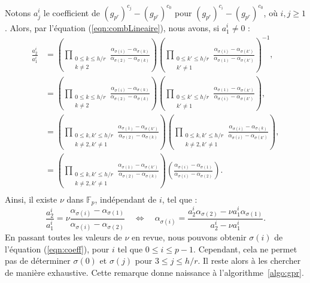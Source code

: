\documentclass[a4paper, titlepage, 11pt]{article}
\theoremstyle{definition}
\theoremstyle{remark}
\def\gf #1{\mathbb{F}_{#1}}
\begin{document}
Notons $a_j^i$ le coefficient de $(g_{p^r})^{c_{{j}}} - (g_{p^r})^{c_{0}}$ pour $(g_{p^r})^{c_{i}} - (g_{p^r})^{c_{0}}$, où $i , j\geqslant 1$. Alors, par l'équation (\ref{eqn:combLineaire}), nous avons, si $a_1^i \neq 0$ :
\begin{align*}
\frac{a_2^i}{a_1^i} &= \left(\prod_{\substack{0\leqslant k\leqslant h/r \\ k \neq 2}} \frac{\alpha_{\sigma(i)}-\alpha_{\sigma(k)}}{\alpha_{\sigma(2)}-\alpha_{\sigma(k)}} \right)\left(\prod_{\substack{0\leqslant k'\leqslant h/r \\ k' \neq 1}} \frac{\alpha_{\sigma(i)}-\alpha_{\sigma({k'})}}{\alpha_{\sigma(1)}-\alpha_{\sigma({k'})}} \right)^{-1}, \\
&= \left(\prod_{\substack{0\leqslant k\leqslant h/r \\ k \neq 2}} \frac{\alpha_{\sigma(i)}-\alpha_{\sigma(k)}}{\alpha_{\sigma(2)}-\alpha_{\sigma(k)}} \right)\left(\prod_{\substack{0\leqslant k' \leqslant h/r \\ k' \neq 1}} \frac{\alpha_{\sigma(1)}-\alpha_{\sigma({k'})}}{\alpha_{\sigma(i)}-\alpha_{\sigma({k'})}} \right), \\
&= \left(\prod_{\substack{0\leqslant k, k'\leqslant h/r \\ k \neq 2, k' \neq 1}} \frac{\alpha_{\sigma(1)}-\alpha_{\sigma({k'})}}{\alpha_{\sigma(2)}-\alpha_{\sigma(k)}} \right) \left(\prod_{\substack{0\leqslant k, k'\leqslant h/r \\ k \neq 2, k' \neq 1}} \frac{\alpha_{\sigma(i)}-\alpha_{\sigma(k)}}{\alpha_{\sigma(i)}-\alpha_{\sigma({k'})}} \right), \\
&= \left(\prod_{\substack{0\leqslant k, k'\leqslant h/r \\ k \neq 2, k' \neq 1}} \frac{\alpha_{\sigma(1)}-\alpha_{\sigma({k'})}}{\alpha_{\sigma(2)}-\alpha_{\sigma(k)}} \right) \left(\frac{\alpha_{\sigma(i)}-\alpha_{\sigma(1)}}{\alpha_{\sigma(i)}-\alpha_{\sigma(2)}} \right). \\
\end{align*}
Ainsi, il existe $\nu$ dans $\gf{p}$, indépendant de $i$, tel que :
\begin{equation}\label{eqn:coeff}
\frac{a_2^i}{a_1^i} = \nu \frac{\alpha_{\sigma(i)}-\alpha_{\sigma(1)}}{\alpha_{\sigma(i)}-\alpha_{\sigma(2)}}\quad\Leftrightarrow\quad
\alpha_{\sigma(i)} = \frac{a_2^i\alpha_{\sigma(2)}-\nu a_1^i\alpha_{\sigma(1)}}{a_2^i-\nu a_1^i}.
\end{equation}
En passant toutes les valeurs de $\nu$ en revue, nous pouvons obtenir $\sigma(i)$ de l'équation (\ref{eqn:coeff}), pour $i$ tel que $0\leqslant i \leqslant p-1$. Cependant, cela ne permet pas de déterminer $\sigma(0)$ et $\sigma(j)$ pour $3 \leqslant j \leqslant h/r$. Il reste alors à les chercher de manière exhaustive. Cette remarque donne naissance à l'algorithme~\ref{algo:gpr}.
\end{document}
